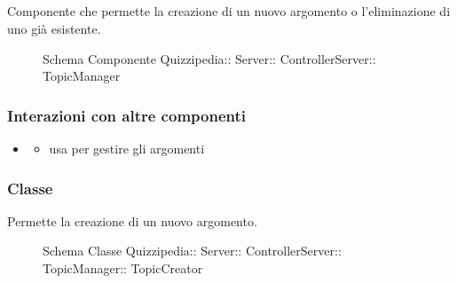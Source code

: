 \subsection{}
Componente che permette la creazione di un nuovo argomento o l'eliminazione di uno già esistente.
\begin{figure}[H]
\centering
\noindent{}
\caption[Schema Componente TopicManager]{Schema Componente Quizzipedia:: Server:: ControllerServer:: TopicManager}
\end{figure}
\subsubsection{Interazioni con altre componenti}
\begin{itemize}
\item {}
\begin{itemize}
\item usa  per gestire gli argomenti
\end{itemize}
\end{itemize}
\subsubsection{Classe }
Permette la creazione di un nuovo argomento.
\begin{figure}[H]
\centering
\noindent{}
\caption[Schema Classe TopicCreator]{Schema Classe Quizzipedia:: Server:: ControllerServer:: TopicManager:: TopicCreator}
\end{figure}
